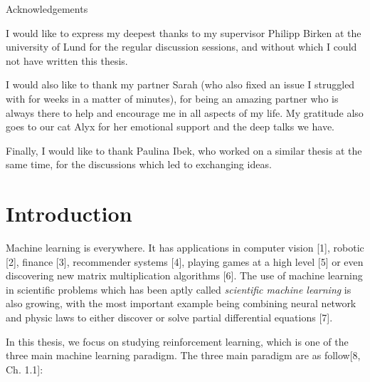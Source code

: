 \documentclass[
  letterpaper,
]{report}
\renewcommand*\contentsname{Table of contents}
\newcommand\contentsname{Table of contents}
\theoremstyle{definition}
\theoremstyle{plain}
\theoremstyle{definition}
\theoremstyle{remark}
\begin{document}
\newpage



\begin{center}
\huge{Acknowledgements}
\end{center}

\vspace*{\baselineskip}

I would like to express my deepest thanks to my supervisor Philipp Birken at the university of Lund for the regular discussion sessions, and without which I could not have written this thesis.

I would also like to thank my partner Sarah (who also fixed an issue I struggled with for weeks in a matter of minutes), for being an amazing partner who is always there to help and encourage me in all aspects of my life. My gratitude also goes to our cat Alyx for her emotional support and the deep talks we have. 

Finally, I would like to thank Paulina Ibek, who worked on a similar thesis at the same time, for the discussions which led to exchanging ideas.

\newpage

\renewcommand*\contentsname{Table of contents}
{
\hypersetup{linkcolor=}
\setcounter{tocdepth}{2}
\tableofcontents
}

\chapter*{Introduction}\label{introduction}


Machine learning is everywhere. It has applications in computer vision
{[}1{]}, robotic {[}2{]}, finance {[}3{]}, recommender systems {[}4{]},
playing games at a high level {[}5{]} or even discovering new matrix
multiplication algorithms {[}6{]}. The use of machine learning in
scientific problems which has been aptly called \emph{scientific machine
learning} is also growing, with the most important example being
combining neural network and physic laws to either discover or solve
partial differential equations {[}7{]}.

In this thesis, we focus on studying reinforcement learning, which is
one of the three main machine learning paradigm. The three main paradigm
are as follow{[}8, Ch. 1.1{]}:
\end{document}
